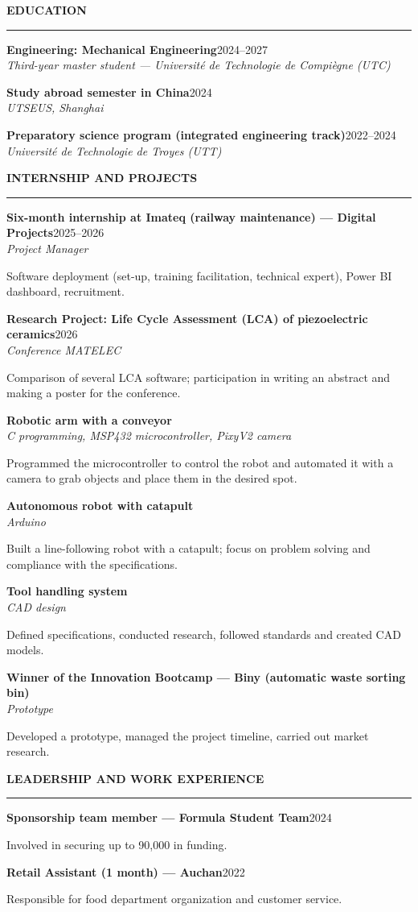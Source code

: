 \documentclass[10pt,a4paper]{article}
\newcommand{\sect}[1]{%
  \vspace{7pt}%
  {\large\bfseries\color{main}\MakeUppercase{#1}}\\[-3pt]
  {\color{main}\rule{\linewidth}{0.6pt}}\par\vspace{3pt}}
\newcommand{\entry}[4]{%
  \textbf{#1}\hfill{\color{soft}\small #2}\\
  {\small\itshape #3}\par
  #4\par\vspace{5pt}}
\begin{document}
\begin{minipage}[t]{0.65\textwidth}

\sect{Education}
\entry{Engineering: Mechanical Engineering}{2024--2027}
  {Third-year master student --- Universit\'e de Technologie de Compi\`egne (UTC)}{}
\entry{Study abroad semester in China}{2024}
  {UTSEUS, Shanghai}{}
\entry{Preparatory science program (integrated engineering track)}{2022--2024}
  {Universit\'e de Technologie de Troyes (UTT)}{}

\sect{Internship and Projects}
\entry{Six-month internship at Imateq (railway maintenance) --- Digital Projects}{2025--2026}
  {Project Manager}
  {Software deployment (set-up, training facilitation, technical expert), Power BI dashboard, recruitment.}
\entry{Research Project: Life Cycle Assessment (LCA) of piezoelectric ceramics}{2026}
  {Conference MATELEC}
  {Comparison of several LCA software; participation in writing an abstract and making a poster for the conference.}
\entry{Robotic arm with a conveyor}{}
  {C programming, MSP432 microcontroller, PixyV2 camera}
  {Programmed the microcontroller to control the robot and automated it with a camera to grab objects and place them in the desired spot.}
\entry{Autonomous robot with catapult}{}
  {Arduino}
  {Built a line-following robot with a catapult; focus on problem solving and compliance with the specifications.}
\entry{Tool handling system}{}
  {CAD design}
  {Defined specifications, conducted research, followed standards and created CAD models.}
\entry{Winner of the Innovation Bootcamp --- Biny (automatic waste sorting bin)}{}
  {Prototype}
  {Developed a prototype, managed the project timeline, carried out market research.}

\sect{Leadership and Work Experience}
\entry{Sponsorship team member --- Formula Student Team}{2024}
  {}{Involved in securing up to \texteuro{}90,000 in funding.}
\entry{Retail Assistant (1 month) --- Auchan}{2022}
  {}{Responsible for food department organization and customer service.}

\end{minipage}
\end{document}
